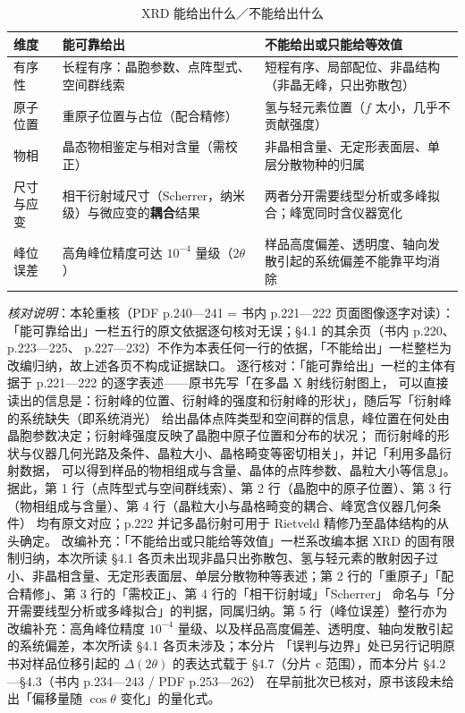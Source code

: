 \begin{table}[htbp]
\centering
\caption{XRD 能给出什么／不能给出什么}
\label{tab:xrd-limits}
{\srcsize
\begin{tabularx}{\columnwidth}{@{}lXX@{}}
\toprule
维度 & 能可靠给出 & 不能给出或只能给等效值 \\
\midrule
有序性 & 长程有序：晶胞参数、点阵型式、空间群线索 & 短程有序、局部配位、非晶结构（非晶无峰，只出弥散包） \\
原子位置 & 重原子位置与占位（配合精修） & 氢与轻元素位置（$f$ 太小，几乎不贡献强度） \\
物相 & 晶态物相鉴定与相对含量（需校正） & 非晶相含量、无定形表面层、单层分散物种的归属 \\
尺寸与应变 & 相干衍射域尺寸（Scherrer，纳米级）与微应变的\textbf{耦合}结果 & 两者分开需要线型分析或多峰拟合；峰宽同时含仪器宽化 \\
峰位误差 & 高角峰位精度可达 $10^{-4}$ 量级（$2\theta$） & 样品高度偏差、透明度、轴向发散引起的系统偏差不能靠平均消除 \\
\bottomrule
\end{tabularx}}
\end{table}

\emph{核对说明}：本轮重核（PDF p.240—241 = 书内 p.221—222 页面图像逐字对读）：
「能可靠给出」一栏五行的原文依据逐句核对无误；§4.1 的其余页（书内 p.220、p.223—225、
p.227—232）不作为本表任何一行的依据，「不能给出」一栏整栏为改编归纳，故上述各页不构成证据缺口。
逐行核对：「能可靠给出」一栏的主体有据于 p.221—222 的逐字表述——原书先写「在多晶 X 射线衍射图上，
可以直接读出的信息是：衍射峰的位置、衍射峰的强度和衍射峰的形状」，随后写「衍射峰的系统缺失（即系统消光）
给出晶体点阵类型和空间群的信息，峰位置在何处由晶胞参数决定；衍射峰强度反映了晶胞中原子位置和分布的状况；
而衍射峰的形状与仪器几何光路及条件、晶粒大小、晶格畸变等密切相关」，并记「利用多晶衍射数据，
可以得到样品的物相组成与含量、晶体的点阵参数、晶粒大小等信息」。据此，第 1 行（点阵型式与空间群线索）、第 2
行（晶胞中的原子位置）、第 3 行（物相组成与含量）、第 4 行（晶粒大小与晶格畸变的耦合、峰宽含仪器几何条件）
均有原文对应；p.222 并记多晶衍射可用于 Rietveld 精修乃至晶体结构的从头确定。
改编补充：「不能给出或只能给等效值」一栏系改编本据 XRD 的固有限制归纳，本次所读 §4.1
各页未出现非晶只出弥散包、氢与轻元素的散射因子过小、非晶相含量、无定形表面层、单层分散物种等表述；第 2
行的「重原子」「配合精修」、第 3 行的「需校正」、第 4 行的「相干衍射域」「Scherrer」
命名与「分开需要线型分析或多峰拟合」的判据，同属归纳。第 5 行（峰位误差）整行亦为改编补充：高角峰位精度
$10^{-4}$ 量级、以及样品高度偏差、透明度、轴向发散引起的系统偏差，本次所读 §4.1 各页未涉及；本分片
「误判与边界」处已另行记明原书对样品位移引起的 $\Delta(2\theta)$ 的表达式载于 §4.7（分片
c 范围），而本分片 §4.2—§4.3（书内 p.234—243 / PDF p.253—262）
在早前批次已核对，原书该段未给出「偏移量随 $\cos\theta$ 变化」的量化式。


